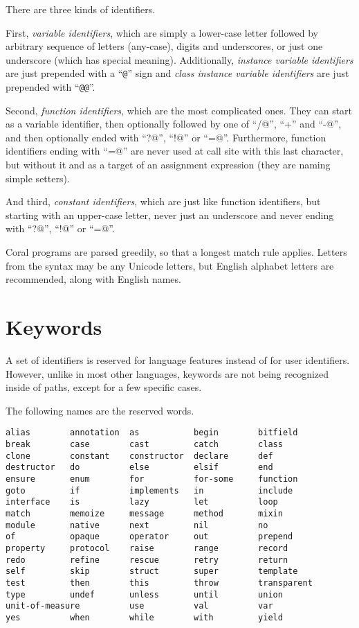 There are three kinds of identifiers.

First, \textit{variable identifiers}, which are simply a lower-case letter followed by arbitrary sequence of letters (any-case), digits and underscores, or just one underscore (which has special meaning). Additionally, \textit{instance variable identifiers} are just prepended with a ``\lstinline|@|'' sign and \textit{class instance variable identifiers} are just prepended with ``\lstinline|@@|''. 

Second, \textit{function identifiers}, which are the most complicated ones. They can start as a variable identifier, then optionally followed by one of ``\lstinline@/@'', ``+'' and ``\lstinline@-@'', and then optionally ended with ``\lstinline@?@'', ``\lstinline@!@'' or ``\lstinline@=@''. Furthermore, function identifiers ending with ``\lstinline@=@'' are never used at call site with this last character, but without it and as a target of an assignment expression (they are naming simple setters). 

And third, \textit{constant identifiers}, which are just like function identifiers, but starting with an upper-case letter, never just an underscore and never ending with ``\lstinline@?@'', ``\lstinline@!@'' or ``\lstinline@=@''.

Coral programs are parsed greedily, so that a longest match rule applies. Letters from the syntax may be any Unicode letters, but English alphabet letters are recommended, along with English names.

\section{Keywords}\label{sec:keywords}

A set of identifiers is reserved for language features instead of for user identifiers. However, unlike in most other languages, keywords are not being recognized inside of paths, except for a few specific cases.

The following names are the reserved words.

\begin{lstlisting}
alias        annotation  as           begin        bitfield
break        case        cast         catch        class
clone        constant    constructor  declare      def
destructor   do          else         elsif        end
ensure       enum        for          for-some     function
goto         if          implements   in           include
interface    is          lazy         let          loop
match        memoize     message      method       mixin
module       native      next         nil          no           
of           opaque      operator     out          prepend
property     protocol    raise        range        record
redo         refine      rescue       retry        return
self         skip        struct       super        template
test         then        this         throw        transparent
type         undef       unless       until        union
unit-of-measure          use          val          var
yes          when        while        with         yield
\end{lstlisting}

